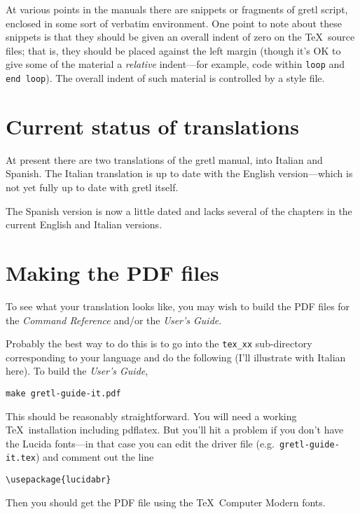 \documentclass{article}
\begin{document}
At various points in the manuals there are snippets or fragments of
\textsf{gretl} script, enclosed in some sort of verbatim environment.
One point to note about these snippets is that they should be given an
overall indent of zero on the \TeX\ source files; that is, they should
be placed against the left margin (though it's OK to give some of the
material a \textit{relative} indent---for example, code within
\texttt{loop} and \texttt{end loop}).  The overall indent of such
material is controlled by a style file.

\section{Current status of translations}

At present there are two translations of the \textsf{gretl} manual,
into Italian and Spanish.  The Italian translation is up to date with
the English version---which is not yet fully up to date with
\textsf{gretl} itself.

The Spanish version is now a little dated and lacks several of the
chapters in the current English and Italian versions.  

\section{Making the PDF files}

To see what your translation looks like, you may wish to build the PDF
files for the \textit{Command Reference} and/or the \textit{User's
  Guide}.

Probably the best way to do this is to go into the \texttt{tex\_xx}
sub-directory corresponding to your language and do the following
(I'll illustrate with Italian here).  To build the \textit{User's
  Guide},

\begin{verbatim}
make gretl-guide-it.pdf
\end{verbatim}

This should be reasonably straightforward.  You will need a working
\TeX\ installation including \textsf{pdflatex}.  But you'll hit a
problem if you don't have the \textsf{Lucida} fonts---in that case you
can edit the driver file (e.g.\ \texttt{gretl-guide-it.tex}) and
comment out the line
%
\begin{verbatim}
\usepackage{lucidabr}
\end{verbatim}
%
Then you should get the PDF file using the \TeX\ Computer Modern
fonts.
\end{document}
